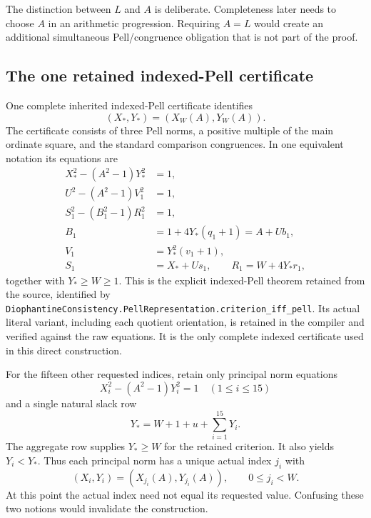 \documentclass[11pt]{article}
\theoremstyle{definition}\newtheorem{definition}[theorem]{Definition}
\theoremstyle{remark}\newtheorem{remark}[theorem]{Remark}
\newcommand{\code}[1]{\nolinkurl{#1}}
\begin{document}
The distinction between $L$ and $A$ is deliberate. Completeness later needs to choose $A$ in an arithmetic progression. Requiring $A=L$ would create an additional simultaneous Pell/congruence obligation that is not part of the proof.

\subsection{The one retained indexed-Pell certificate}

One complete inherited indexed-Pell certificate identifies
\begin{equation}\label{eq:cap}
 (X_*,Y_*)=(X_W(A),Y_W(A)).
\end{equation}
The certificate consists of three Pell norms, a positive multiple of the main ordinate square, and the standard comparison congruences. In one equivalent notation its equations are
\begin{align*}
 X_*^2-(A^2-1)Y_*^2&=1,\\
 U^2-(A^2-1)V_1^2&=1,\\
 S_1^2-(B_1^2-1)R_1^2&=1,\\
 B_1&=1+4Y_*(q_1+1)=A+Ub_1,\\
 V_1&=Y_*^2(v_1+1),\\
 S_1&=X_*+Us_1,\qquad R_1=W+4Y_*r_1,
\end{align*}
together with $Y_*\ge W\ge1$. This is the explicit indexed-Pell theorem retained from the source, identified by
\code{DiophantineConsistency.PellRepresentation.criterion_iff_pell}. Its actual literal variant, including each quotient orientation, is retained in the compiler and verified against the raw equations. It is the only complete indexed certificate used in this direct construction.

For the fifteen other requested indices, retain only principal norm equations
\begin{equation}\label{eq:principals}
 X_i^2-(A^2-1)Y_i^2=1\quad(1\le i\le15)
\end{equation}
and a single natural slack row
\begin{equation}\label{eq:aggregate}
 Y_*=W+1+u+\sum_{i=1}^{15}Y_i.
\end{equation}
The aggregate row supplies $Y_*\ge W$ for the retained criterion. It also yields $Y_i<Y_*$. Thus each principal norm has a unique actual index $j_i$ with
\begin{equation}\label{eq:actualbound}
 (X_i,Y_i)=(X_{j_i}(A),Y_{j_i}(A)),\qquad0\le j_i<W.
\end{equation}
At this point the actual index need not equal its requested value. Confusing these two notions would invalidate the construction.
\end{document}
